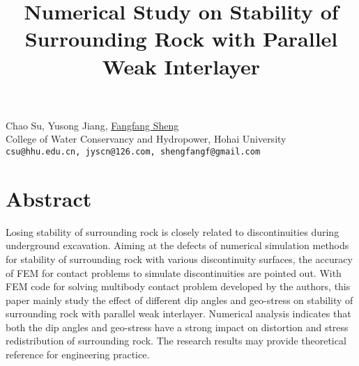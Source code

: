 \title{Numerical Study on Stability of Surrounding Rock with Parallel Weak Interlayer}
\author{} \institute{}
\maketitle

\begin{center}
{\large Chao Su, Yusong Jiang, \underline{Fangfang Sheng}}\\
College of Water Conservancy and Hydropower, Hohai University\\
{\tt csu@hhu.edu.cn, jyscn@126.com, shengfangf@gmail.com}
\end{center}

\section*{Abstract}
Losing stability of surrounding rock is closely related to discontinuities during underground excavation. Aiming at the defects of numerical simulation methods for stability of surrounding rock with various discontinuity surfaces, the accuracy of FEM for contact problems to simulate discontinuities are pointed out. With FEM code for solving multibody contact problem developed by the authors, this paper mainly study the effect of different dip angles and geo-stress on stability of surrounding rock with parallel weak interlayer. Numerical analysis indicates that both the dip angles and geo-stress have a strong impact on distortion and stress redistribution of surrounding rock. The research results may provide theoretical reference for engineering practice.

